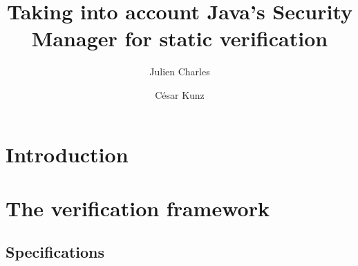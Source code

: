 \documentclass[draft]{llncs}
\begin{document}
\newcommand{\rarrow}{$\rightarrow$}
\newcommand{\conj}{$\wedge$}
\newcommand{\disjonc}{$\vee$}
\newcommand{\s}{\,}
\newcommand{\btab}{\begin{tt}\begin{tabbing}}
\newcommand{\etab}{\end{tabbing}\end{tt}}
\newcommand{\bcode}{\begin{tt}\begin{small}\begin{tabbing}}
\newcommand{\ecode}{\end{tabbing}\end{small}\end{tt}}
%
\frontmatter          %
%

\mainmatter              %
%
\title{Taking into account Java's Security Manager for static verification}
%
%
\author{Julien Charles \and C\'esar Kunz}
%
%
%

\maketitle              %

\begin{abstract}

\end{abstract}
%
\section{Introduction}




\section{The verification framework}



\subsection{Specifications}

\end{document}
